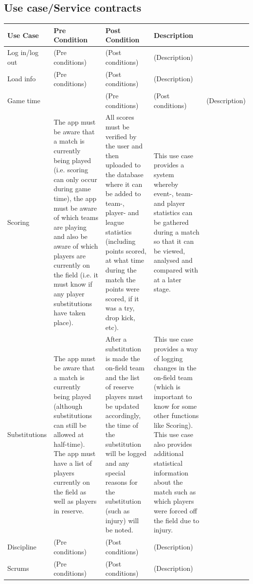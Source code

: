\documentclass[a4paper,12pt]{report}
\begin{document}
{\begin{itemize}
\subsection{Use case/Service contracts}
\begin{center}
  \begin{longtable}{| p{3cm} | p{4cm} | p{4cm} | p{4cm} |}
    \hline
    Use Case & Pre Condition & Post Condition & Description \\ \hline \hline
    Log in/log out & (Pre conditions) & (Post conditions) & (Description)\\ \hline
    Load info & (Pre conditions) & (Post conditions)  & (Description) \\ \hline
    Game time & & (Pre conditions) & (Post conditions)  & (Description) \\ \hline
    Scoring & The app must be aware that a match is currently being played (i.e. scoring can only occur during game time), the app must be aware of which teams are playing and also be aware of which players are currently on the field (i.e. it must know if any player substitutions have taken place). & All scores must be verified by the user and then uploaded to the database where it can be added to team-, player- and league statistics (including points scored, at what time during the match the points were scored, if it was a try, drop kick, etc). & This use case provides a system whereby event-, team- and player statistics can be gathered during a match so that it can be viewed, analysed and compared with at a later stage.\\ \hline
    Substitutions & The app must be aware that a match is currently being played (although substitutions can still be allowed at half-time). The app must have a list of players currently on the field as well as players in reserve. & After a substitution is made the on-field team and the list of reserve players must be updated accordingly, the time of the substitution will be logged and any special reasons for the substitution (such as injury) will be noted. & This use case provides a way of logging changes in the on-field team (which is important to know for some other functions like Scoring). This use case also provides additional statistical information about the match such as which players were forced off the field due to injury.\\ \hline
    Discipline & (Pre conditions) & (Post conditions) & (Description)\\ \hline
    Scrums & (Pre conditions) & (Post conditions) & (Description)\\ \hline

\end{longtable}
\end{center}
\end{itemize}}
\end{document}
